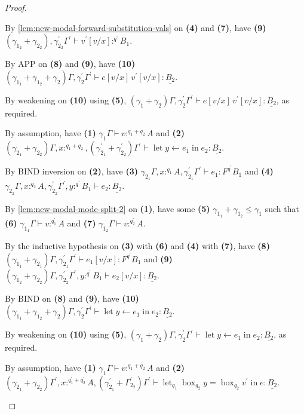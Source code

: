 \documentclass[acmsmall,screen,nonacm]{acmart}
\DeclareMathOperator{\llet}{\text{let}}
\DeclareMathOperator{\lin}{\text{in}}
\DeclareMathOperator{\bbox}{\text{box}}
\newcommand{\tee}{\vdash}
\begin{document}
\begin{proof}
\begin{description}
    By \ref{lem:new-modal-forward-substitution-vals} on \textbf{(4)} and \textbf{(7)}, have \textbf{(9)} $(\gamma_{1_2} + \gamma_{2_2}), \gamma_{2_2}^\prime\Gamma^\prime \tee v^\prime[v/x] :^{q^\prime} B_1$.

    By APP on \textbf{(8)} and \textbf{(9)}, have \textbf{(10)} $(\gamma_{1_1} + \gamma_{1_2} + \gamma_2)\Gamma, \gamma_2^\prime\Gamma^\prime \tee e[v/x] \, v^\prime[v/x] : \underline{B_2}$.

    By weakening on \textbf{(10)} using \textbf{(5)}, $(\gamma_1 + \gamma_2)\Gamma, \gamma_2^\prime\Gamma^\prime \tee e[v/x] \, v^\prime[v/x] : \underline{B_2}$, as required.
    \\
    \item[Case BIND.]
    By assumption, have \textbf{(1)} $\gamma_1\Gamma \tee v :^{q_1 + q_2} A$ and \textbf{(2)} $(\gamma_{2_1} + \gamma_{2_2})\Gamma, x :^{q_1 + q_2}, (\gamma_{2_1}^\prime + \gamma_{2_2}^\prime)\Gamma^\prime \tee \llet y \leftarrow e_1 \lin e_2 : \underline{B_2}$.

    By BIND inversion on \textbf{(2)}, have \textbf{(3)} $\gamma_{2_1}\Gamma, x :^{q_1} A, \gamma_{2_1}^\prime\Gamma^\prime \tee e_1 : F^{q^\prime} B_1$ and \textbf{(4)} $\gamma_{2_2}\Gamma, x :^{q_2} A, \gamma_{2_2}^\prime\Gamma^\prime, y :^{q^\prime} B_1 \tee e_2 : \underline{B_2}$.
    
    By \ref{lem:new-modal-mode-split-2} on \textbf{(1)}, have some \textbf{(5)} $\gamma_{1_1} + \gamma_{1_2} \le \gamma_1$ such that \textbf{(6)} $\gamma_{1_1}\Gamma \tee v :^{q_1^\prime} A$ and \textbf{(7)} $\gamma_{1_2}\Gamma \tee v :^{q_2^\prime} A$.

    By the inductive hypothesis on \textbf{(3)} with \textbf{(6)} and \textbf{(4)} with \textbf{(7)}, have \textbf{(8)} $(\gamma_{1_1} + \gamma_{2_1})\Gamma, \gamma_{2_1}^\prime\Gamma^\prime \tee e_1[v/x] : F^{q^\prime} B_1$ and \textbf{(9)} $(\gamma_{1_2} + \gamma_{2_2})\Gamma, \gamma_{2_2}^\prime\Gamma^\prime, y :^{q^\prime} B_1 \tee e_2[v/x] : \underline{B_2}$.

    By BIND on \textbf{(8)} and \textbf{(9)}, have \textbf{(10)} $(\gamma_{1_1} + \gamma_{1_2} + \gamma_2)\Gamma, \gamma_2^\prime\Gamma^\prime \tee \llet y \leftarrow e_1 \lin e_2 : \underline{B_2}$.

    By weakening on \textbf{(10)} using \textbf{(5)}, $(\gamma_1 + \gamma_2)\Gamma, \gamma_2^\prime\Gamma^\prime \tee \llet y \leftarrow e_1 \lin e_2 : \underline{B_2}$, as required.
    \\
    \item[Case $\boxempty$E.]
    By assumption, have \textbf{(1)} $\gamma_1\Gamma \tee v :^{q_1 + q_2} A$ and \textbf{(2)} $(\gamma_{2_1} + \gamma_{2_2})\Gamma^\prime, x :^{q_1^\prime + q_2^\prime} A, (\gamma_{2_1}^\prime + \Gamma_{2_2}^\prime)\Gamma^\prime \tee \llet_{q_1} \bbox_{q_2} y = \bbox_{q_2} v^\prime \lin e : \underline{B_2}$.


\end{description}
\end{proof}
\end{document}
